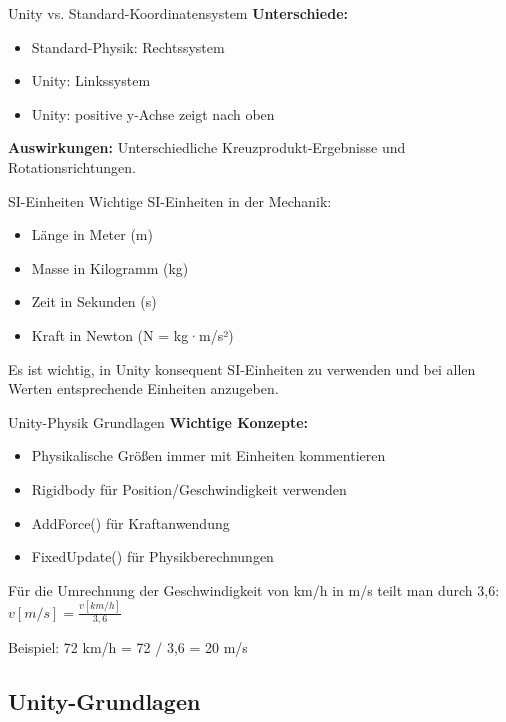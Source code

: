 \begin{example2}{Unity vs. Standard-Koordinatensystem}
    \textbf{Unterschiede:}
    \begin{itemize}
        \item Standard-Physik: Rechtssystem
        \item Unity: Linkssystem
        \item Unity: positive y-Achse zeigt nach oben
    \end{itemize}
    
    \textbf{Auswirkungen:} Unterschiedliche Kreuzprodukt-Ergebnisse und Rotationsrichtungen.
\end{example2}

\begin{definition}{SI-Einheiten}
    Wichtige SI-Einheiten in der Mechanik:
    \begin{itemize}
        \item Länge in Meter (m)
        \item Masse in Kilogramm (kg)
        \item Zeit in Sekunden (s)
        \item Kraft in Newton (N = kg·m/s²)
    \end{itemize}
    Es ist wichtig, in Unity konsequent SI-Einheiten zu verwenden und bei allen Werten entsprechende Einheiten anzugeben.
\end{definition}

\begin{concept}{Unity-Physik Grundlagen}
    \textbf{Wichtige Konzepte:}
    \begin{itemize}
        \item Physikalische Größen immer mit Einheiten kommentieren
        \item Rigidbody für Position/Geschwindigkeit verwenden
        \item AddForce() für Kraftanwendung
        \item FixedUpdate() für Physikberechnungen
    \end{itemize}
\end{concept}

\begin{example}
    Für die Umrechnung der Geschwindigkeit von km/h in m/s teilt man durch 3,6:
    $v[m/s] = \frac{v[km/h]}{3,6}$
    
    Beispiel: 72 km/h = 72 / 3,6 = 20 m/s
\end{example}


\subsection{Unity-Grundlagen}

